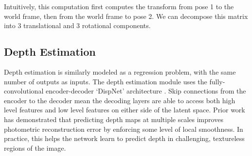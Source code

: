 Intuitively, this computation first computes the transform from pose 1 to the world frame, then from the world frame to pose 2. We can decompose this matrix into 3 translational and 3 rotational components. 


\subsection{Depth Estimation}

Depth estimation is similarly modeled as a regression problem, with the same number of outputs as inputs. The depth estimation module uses the fully-convolutional encoder-decoder `DispNet' architecture \cite{mayer2015dispnet}. Skip connections from the encoder to the decoder mean the decoding layers are able to access both high level features and low level features on either side of the latent space. Prior work \cite{zhou2017unsupervised} has demonstrated that predicting depth maps at multiple scales improves photometric reconstruction error by enforcing some level of local smoothness. In practice, this helps the network learn to predict depth in challenging, textureless regions of the image. 

